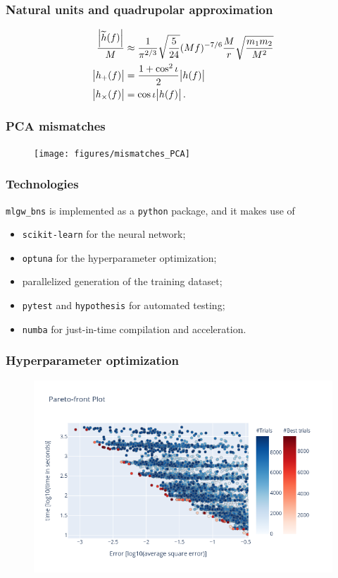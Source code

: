 \documentclass{beamer}
\begin{document}
\begin{frame}
    \frametitle{Natural units and quadrupolar approximation}
    \begin{align}
    \frac{\abs{\widetilde{h}(f)}}{M} &\approx \frac{1}{\pi^{2/3}} \sqrt{\frac{5}{24}} (Mf)^{-7/6} \frac{M}{r} \sqrt{\frac{m_1 m_2 }{M^2}} \\
    \abs{h_{+}(f)} &= \frac{1 + \cos^2 \iota }{2} \abs{h (f)} \\
    \abs{h_{ \times }(f)} &= \cos \iota  \abs{h (f)}
    \,.
    \end{align}
\end{frame}


\begin{frame}
    \frametitle{PCA mismatches}
    \begin{figure}[ht]
    \centering
    \texttt{[image: figures/mismatches\_PCA]}
    \label{fig:mismatches_PCA}
    \end{figure}
\end{frame}

\begin{frame}
    \frametitle{Technologies}
    \texttt{mlgw\_bns} is implemented as a \texttt{python} package, and it makes use of 
    \begin{itemize}
        \item \texttt{scikit-learn} for the neural network;
        \item \texttt{optuna} for the hyperparameter optimization;
        \item parallelized generation of the training dataset;
        \item \texttt{pytest} and \texttt{hypothesis} for automated testing;
        \item \texttt{numba} for just-in-time compilation and acceleration.
    \end{itemize}
\end{frame}

\begin{frame}
    \frametitle{Hyperparameter optimization}
    \begin{figure}[ht]
    \centering
    \includegraphics[width=\textwidth]{figures/pareto-front}
    \label{fig:pareto-front-nonspinning}
    \end{figure}
\end{frame}
\end{document}
